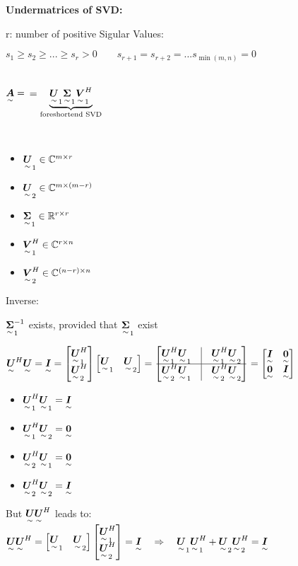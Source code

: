 \vspace{5mm} 
\textbf{Undermatrices of SVD:}

r: number of positive Sigular Values:

$s_1\geq s_2\geq ...\geq s_r > 0   \qquad  s_{r+1}=s_{r+2}=...s_{\min(m,n)}=0$

\ \\

$\ma{A}=$\quad {}   \quad
$=\underbrace{\ma{U}_1\ma{\Sigma}_1\ma{V}_1^H}_{\textrm{foreshortend SVD}}$

\ \\

\begin{itemize}
\item $\ma{U}_1 \in \mathbb{C}^{m\times r}$
\item $\ma{U}_2 \in \mathbb{C}^{m\times (m-r)}$
\item $\ma{\Sigma}_1 \in \mathbb{R}^{r\times r}$
\item $\ma{V}_1^H \in \mathbb{C}^{r\times n}$
\item $\ma{V}_2^H \in \mathbb{C}^{(n-r)\times n}$
\end{itemize}

Inverse:

$\ma{\Sigma}_1^{-1}$ exists, provided that $\ma{\Sigma}_1$ exist

$\ma{U}^H\ma{U}=\ma{I}=\mat{\ma{U}_1^H\\\ma{U}_2^H} \mat{\ma{U}_1&\ma{U}_2} 
=\mat{\ma{U}_1^H\ma{U}_1 &\vline& \ma{U}_1^H\ma{U}_2 \\ \hline \ma{U}_2^H\ma{U}_1 &\vline& \ma{U}_2^H\ma{U}_2} = \mat{\ma{I}&\ma{0}\\\ma{0}&\ma{I}}$
\begin{itemize}
\item $\ma{U}_1^H\ma{U}_1 = \ma{I}$
\item $\ma{U}_1^H\ma{U}_2 = \ma{0}$
\item $\ma{U}_2^H\ma{U}_1 = \ma{0}$
\item$\ma{U}_2^H\ma{U}_2 = \ma{I}$
\end{itemize}

But $\ma{U}\ma{U}^H$ leads to:\\
$\ma{U}\ma{U}^H=\mat{\ma{U}_1 &\ma{U}_2}\mat{\ma{U}_1^H \\\ma{U}_2^H}=\ma{I}  \pfeil \ma{U}_1 \ma{U}_1^H+\ma{U}_2 \ma{U}_2^H=\ma{I}$



